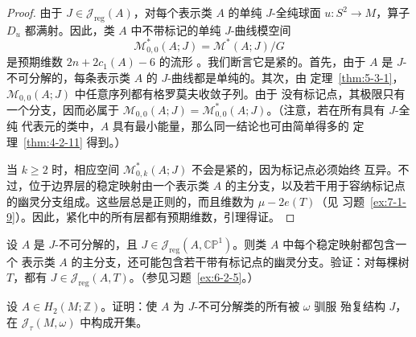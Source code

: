 \begin{proof}
由于 $J\in\mathcal J_{\mathrm{reg}}(A)$，对每个表示类 $A$ 的单纯 $J$-全纯球面
$u:S^2\to M$，算子 $D_u$ 都满射。因此，类 $A$ 中不带标记的单纯 $J$-曲线模空间
\[
  \mathcal M^*_{0,0}(A;J)=\mathcal M^*(A;J)/G
\]
是预期维数 $2n+2c_1(A)-6$ 的流形
。我们断言它是紧的。首先，由于 $A$ 是
$J$-不可分解的，每条表示类 $A$ 的 $J$-曲线都是单纯的。其次，由
定理~\ref{thm:5-3-1}，$\mathcal M_{0,0}(A;J)$ 中任意序列都有格罗莫夫收敛子列。由于
没有标记点，其极限只有一个分支，因而必属于
$\mathcal M_{0,0}(A;J)=\mathcal M^*_{0,0}(A;J)$。（注意，若在所有具有 $J$-全纯
代表元的类中，$A$ 具有最小能量，那么同一结论也可由简单得多的
定理~\ref{thm:4-2-11} 得到。）

当 $k\ge2$ 时，相应空间 $\mathcal M^*_{0,k}(A;J)$ 不会是紧的，因为标记点必须始终
互异。不过，位于边界层的稳定映射由一个表示类 $A$ 的主分支，以及若干用于容纳标记点
的幽灵分支组成。这些层总是正则的，而且维数为 $\mu-2e(T)$（见
习题~\ref{ex:7-1-9}）。因此，紧化中的所有层都有预期维数，引理得证。
\end{proof}
\begin{exercise}\label{ex:7-1-9}
设 $A$ 是 $J$-不可分解的，且
$J\in\mathcal J_{\mathrm{reg}}(A,\mathbb{CP}^1)$。则类 $A$ 中每个稳定映射都包含一个
表示类 $A$ 的主分支，还可能包含若干带有标记点的幽灵分支。验证：对每棵树 $T$，都有
$J\in\mathcal J_{\mathrm{reg}}(A,T)$。（参见习题~\ref{ex:6-2-5}。）
\end{exercise}

\begin{exercise}\label{ex:7-1-10}
设 $A\in H_2(M;\mathbb Z)$。证明：使 $A$ 为 $J$-不可分解类的所有被 $\omega$ 驯服
殆复结构 $J$，在 $\mathcal J_\tau(M,\omega)$ 中构成开集。
\end{exercise}

